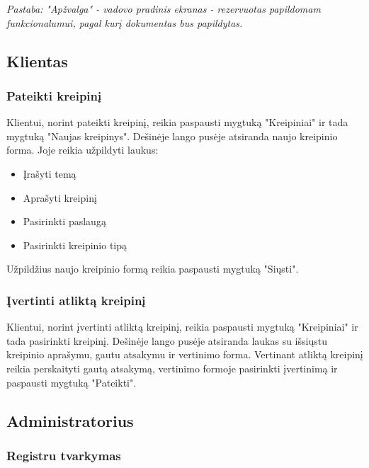 	\textit{Pastaba: "Apžvalga" - vadovo pradinis ekranas - rezervuotas papildomam funkcionalumui, pagal kurį dokumentas bus papildytas.}
	
\subsection{Klientas}

	\subsubsection{Pateikti kreipinį}
	
	
	Klientui, norint pateikti kreipinį, reikia paspausti mygtuką "Kreipiniai" ir tada mygtuką "Naujas kreipinys".
	Dešinėje lango pusėje atsiranda naujo kreipinio forma. Joje reikia užpildyti laukus:
	
	\begin{itemize}
		\item Įrašyti temą
		\item Aprašyti kreipinį
		\item Pasirinkti paslaugą
		\item Pasirinkti kreipinio tipą
	\end{itemize}
	
	Užpildžius naujo kreipinio formą reikia paspausti mygtuką "Siųsti".

	\subsubsection{Įvertinti atliktą kreipinį}
	
	
	Klientui, norint įvertinti atliktą kreipinį, reikia paspausti mygtuką "Kreipiniai" ir tada pasirinkti kreipinį.
	Dešinėje lango pusėje atsiranda laukas su išsiųstu kreipinio aprašymu, gautu atsakymu ir vertinimo forma.
	Vertinant atliktą kreipinį reikia perskaityti gautą atsakymą, vertinimo formoje pasirinkti įvertinimą ir paspausti mygtuką "Pateikti".
	
\subsection{Administratorius}

	\subsubsection{Registru tvarkymas}
	
